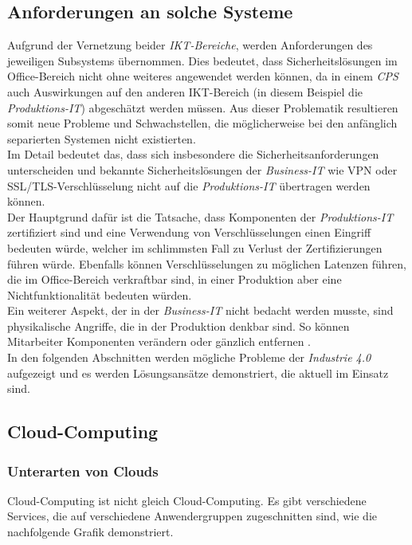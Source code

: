 \documentclass[conference]{IEEEtran}
\begin{document}
\subsection{Anforderungen an solche Systeme}
Aufgrund der Vernetzung beider \textit{IKT-Bereiche}, werden Anforderungen des jeweiligen Subsystems übernommen. Dies bedeutet, dass Sicherheitslösungen im Office-Bereich nicht ohne weiteres angewendet werden können, da in einem \textit{CPS} auch Auswirkungen auf den anderen IKT-Bereich (in diesem Beispiel die \textit{Produktions-IT}) abgeschätzt werden müssen. Aus dieser Problematik resultieren somit neue Probleme und Schwachstellen, die möglicherweise bei den anfänglich separierten Systemen nicht existierten.\\
Im Detail bedeutet das, dass sich insbesondere die Sicherheitsanforderungen unterscheiden und bekannte Sicherheitslösungen der \textit{Business-IT} wie VPN oder SSL/TLS-Verschlüsselung nicht auf die \textit{Produktions-IT} übertragen werden können.\\
Der Hauptgrund dafür ist die Tatsache, dass Komponenten der \textit{Produktions-IT} zertifiziert sind und eine Verwendung von Verschlüsselungen einen Eingriff bedeuten würde, welcher im schlimmsten Fall zu Verlust der Zertifizierungen führen würde. Ebenfalls können Verschlüsselungen zu möglichen Latenzen führen, die im Office-Bereich verkraftbar sind, in einer Produktion aber eine Nichtfunktionalität bedeuten würden.\\
Ein weiterer Aspekt, der in der \textit{Business-IT} nicht bedacht werden musste, sind physikalische Angriffe, die in der Produktion denkbar sind. So können Mitarbeiter Komponenten verändern oder gänzlich entfernen \cite{eckert2015}.     
\vspace{0.3cm}
\\
In den folgenden Abschnitten werden mögliche Probleme der \textit{Industrie 4.0} aufgezeigt und es werden Lösungsansätze demonstriert, die aktuell im Einsatz sind.

\subsection{Cloud-Computing}

\subsubsection{Unterarten von Clouds}
Cloud-Computing ist nicht gleich Cloud-Computing. Es gibt verschiedene Services, die auf verschiedene Anwendergruppen zugeschnitten sind, wie die nachfolgende Grafik demonstriert.\\
\end{document}
